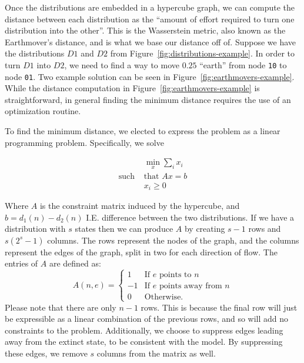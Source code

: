 \documentclass{article}
\begin{document}
Once the distributions are embedded in a hypercube graph, we can compute the distance between each distribution as the
``amount of effort required to turn one distribution into the other''. This is the Wasserstein metric, also known as the
Earthmover's distance, and is what we base our distance off of. Suppose we have the distributions $D1$ and $D2$ from
Figure~\ref{fig:distributions-example}. In order to turn $D1$ into $D2$, we need to find a way to move $0.25$ ``earth''
from node \texttt{10} to node \texttt{01}. Two example solution can be seen in Figure~\ref{fig:earthmovers-example}.
While the distance computation in Figure~\ref{fig:earthmovers-example} is straightforward, in general finding the
minimum distance requires the use of an optimization routine.

To find the minimum distance, we elected to express the problem as a linear programming problem. Specifically, we solve

\begin{align}
&\min_x \textstyle \sum_i x_i \nonumber \\
\text{such } &\text{that } Ax = b\\
             & x_i \geq 0 \nonumber
\end{align}

Where $A$ is the constraint matrix induced by the hypercube, and $b = d_1(n) - d_2(n)$ I.E. difference between the two
distributions. If we have a distribution with $s$ states then we can produce $A$ by creating $s-1$ rows and $s(2^{s}-1)$
columns. The rows represent the nodes of the graph, and the columns represent the edges of the graph, split in two for
each direction of flow. The entries of $A$ are defined as:
\begin{equation}
  A(n, e) = \begin{cases}
    1 &\text{If } e \text{ points to } n\\
    -1 &\text{If } e \text{ points away from } n\\
    0 &\text{Otherwise.}
  \end{cases}
\end{equation}
Please note that there are only $n-1$ rows. This is because the final row will just be expressible as a linear
combination of the previous rows, and so will add no constraints to the problem. Additionally, we choose to suppress
edges leading away from the extinct state, to be consistent with the model. By suppressing these edges, we remove $s$
columns from the matrix as well.
\end{document}
